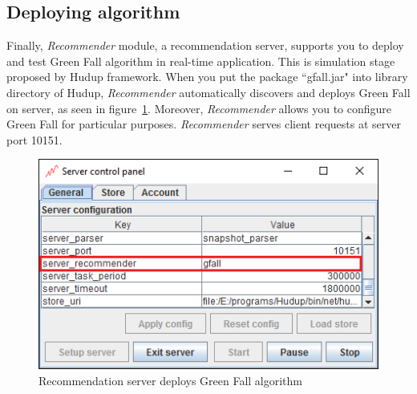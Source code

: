\documentclass[a4paper,twoside]{article}
\begin{document}
\subsection{Deploying algorithm}
\label{subsec:tutorial-deploying}
Finally, \textit{Recommender} module, a recommendation server, supports you to deploy and test Green Fall algorithm in real-time application. This is simulation stage proposed by Hudup framework. When you put the package ``gfall.jar" into library directory of Hudup, \textit{Recommender} automatically discovers and deploys Green Fall on server, as seen in figure~\ref{figure:recommender-gfall}. Moreover, \textit{Recommender} allows you to configure Green Fall for particular purposes. \textit{Recommender} serves client requests at server port 10151.
\begin{figure}
\centering
\includegraphics{RecommenderDeployGreenFall.png}
\caption{Recommendation server deploys Green Fall algorithm}
\label{figure:recommender-gfall}
\end{figure}
\end{document}
